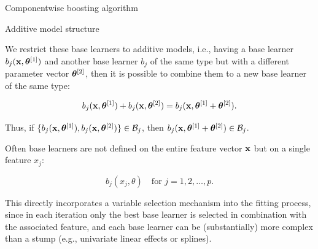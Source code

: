 \begin{vbframe}{Componentwise boosting algorithm}



\end{vbframe}
\begin{vbframe}{Additive model structure}
\begin{footnotesize}
We restrict these base learners to additive models, i.e., having a base learner $ b_j(\mathbf{x}, \bm{\theta}^{[1]})$ and another base learner $b_j$ of the same type but with a different parameter vector $\bm{\theta}^{[2]}$, then it is possible to combine them to a new base learner of the same type:

$$
 b_j(\mathbf{x}, \bm{\theta}^{[1]}) + b_j(\mathbf{x}, \bm{\theta}^{[2]}) =
 b_j(\mathbf{x}, \bm{\theta}^{[1]} + \bm{\theta}^{[2]}).
$$
\vspace*{0.1cm}

Thus, if $\{ b_j(\mathbf{x}, \bm{\theta}^{[1]}), b_j(\mathbf{x}, \bm{\theta}^{[2]}) \} \in \mathcal{B}_j$, then $b_j(\mathbf{x}, \bm{\theta}^{[1]} + \bm{\theta}^{[2]}) \in \mathcal{B}_j$.
\lz

Often base learners are not defined on the entire feature vector $\mathbf{x}$ but on
a single feature $x_j$:

$$
  b_j(x_j, \theta) \quad \text{for } j = 1, 2, \dots, p.
$$

This directly incorporates a variable selection mechanism into the fitting
process, since in each iteration only the best base learner is selected in
combination with the associated feature, and each base learner can be
(substantially) more complex than a stump (e.g., univariate linear effects or
splines).
\end{footnotesize}
\end{vbframe}




